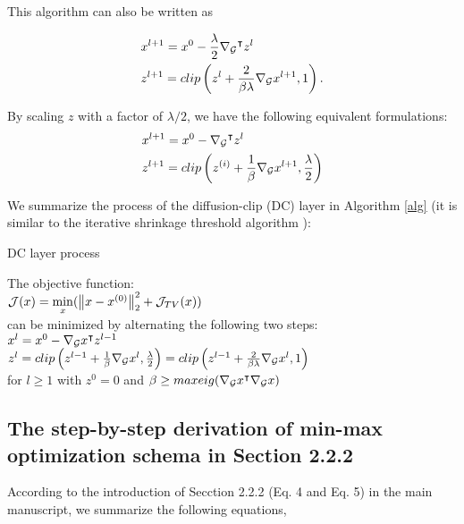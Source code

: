 \documentclass{article}
\begin{document}
This algorithm can also be written as

\begin{equation}
   \begin{aligned}
& x^{l+1}=x^0-\frac{\lambda}{2} {\nabla _{\cal G}}^ \intercal z^{l} \\
& z^{l+1}=clip \left(z^{l}+\frac{2}{\beta\lambda} {\nabla _{\cal G}} x^{l+1}, 1\right) .
\end{aligned}
\label{final2}
\end{equation}

By scaling $z$ with a factor of $\lambda /2$, we have the following equivalent formulations:
\begin{equation}
\begin{aligned}
& x^{l+1}=x^0-{\nabla _{\cal G}}^\intercal z^{l} \\
& z^{l+1}=clip\left(z^{(i)}+\frac{1}{\beta} {\nabla _{\cal G}} x^{l+1}, \frac{\lambda}{2}\right)
\end{aligned}
\end{equation}

We summarize the process of the diffusion-clip (DC) layer in Algorithm \ref{alg} (it is similar to the iterative shrinkage threshold algorithm \cite{daubechies2004iterative}):

\begin{algorithm}
\caption{DC layer process}
The objective function:\\

${\cal J}(x)=\mathop {\min }\limits_x (\left\| {x - x^{(0)}} \right\|_2^2 + \mathcal{J}_{TV}(x))$\\

can be minimized by alternating the following two steps:\\

$ x^{l}=x^0-{\nabla _{\cal G}}x^\intercal z^{l-1} $\\

$z^{l}=clip \left(z^{l-1}+\frac{1}{\beta} {\nabla _{\cal G}} x^{l}, \frac{\lambda}{2}\right) = clip \left(z^{l-1}+\frac{2}{\beta\lambda} {\nabla _{\cal G}} x^{l}, 1\right) $\\

for $l \ge 1$ with $z^0=0$ and $\beta \ge maxeig({\nabla _{\cal G}}x^ \intercal{\nabla _{\cal G}}x )$
\label{alg}
\end{algorithm}


\subsection{The step-by-step derivation of min-max optimization schema in Section 2.2.2}
\label{secs1.2}
According to the introduction of Secction 2.2.2 (Eq. 4 and Eq. 5) in the main manuscript, we summarize the following equations,
\end{document}
